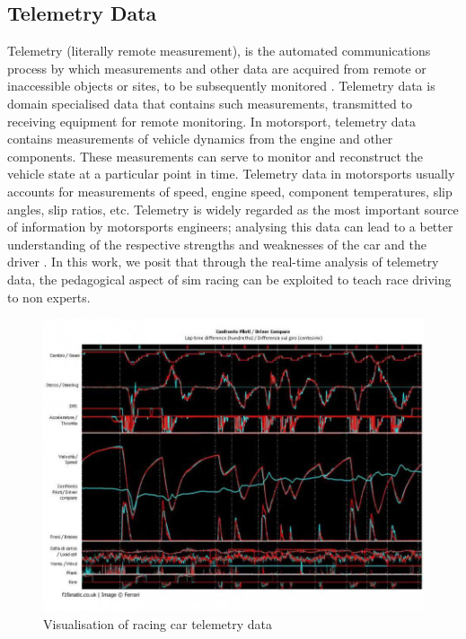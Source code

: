 \subsection{Telemetry Data}
Telemetry (literally remote measurement), is the automated communications process by which measurements and other data are acquired from remote or inaccessible objects or sites, to be subsequently monitored \cite{nasaTelemetry}. Telemetry data is domain specialised data that contains such measurements, transmitted to receiving equipment for remote monitoring. In motorsport, telemetry data contains measurements of vehicle dynamics from the engine and other components. These measurements can serve to monitor and reconstruct the vehicle state at a particular point in time. Telemetry data in motorsports usually accounts for measurements of speed, engine speed, component temperatures, slip angles, slip ratios, etc. Telemetry is widely regarded as the most important source of information by motorsports engineers; analysing this data can lead to a better understanding of the respective strengths and weaknesses of the car and the driver \cite{CarDataAnalysis}. In this work, we posit that through the real-time analysis of telemetry data, the pedagogical aspect of sim racing can be exploited to teach race driving to non experts.  

\begin{figure}[!htb]
	\centering
	\includegraphics[width=\textwidth]{charts/telemetrydata.jpg}
	\caption{Visualisation of racing car telemetry data}
	\label{fig:telemetrydata}
\end{figure}

